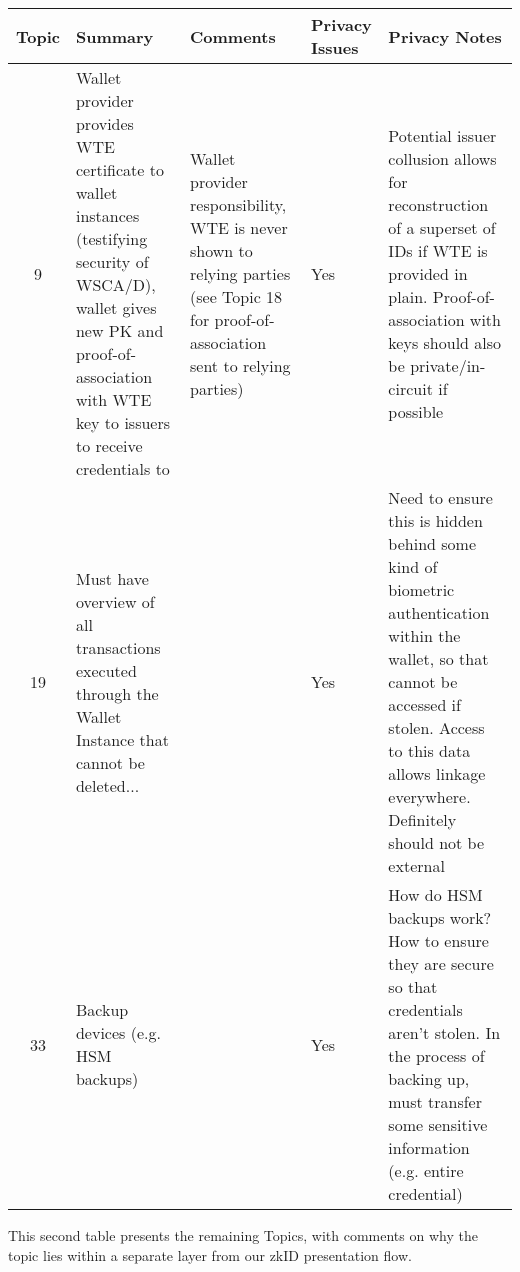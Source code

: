 \footnotesize
\begin{longtable}{|c|p{}|p{}|p{}|p{}|}
\hline
\textbf{Topic} & \textbf{Summary} & \textbf{Comments} & \textbf{Privacy Issues} & \textbf{Privacy Notes} \\
\hline
\endhead
9 & Wallet provider provides WTE certificate to wallet instances (testifying security of WSCA/D), wallet gives new PK and proof-of-association with WTE key to issuers to receive credentials to & Wallet provider responsibility, WTE is never shown to relying parties (see Topic 18 for proof-of-association sent to relying parties) & Yes & Potential issuer collusion allows for reconstruction of a superset of IDs if WTE is provided in plain. Proof-of-association with keys should also be private/in-circuit if possible \\
\hline

19 & Must have overview of all transactions executed through the Wallet Instance that cannot be deleted... & & Yes & Need to ensure this is hidden behind some kind of biometric authentication within the wallet, so that cannot be accessed if stolen. Access to this data allows linkage everywhere. Definitely should not be external \\
\hline

33 & Backup devices (e.g. HSM backups) & & Yes & How do HSM backups work? How to ensure they are secure so that credentials aren't stolen. In the process of backing up, must transfer some sensitive information (e.g. entire credential) \\
\hline

\end{longtable}

This second table presents the remaining Topics, with comments on why the topic lies within a separate layer from our zkID presentation flow.

